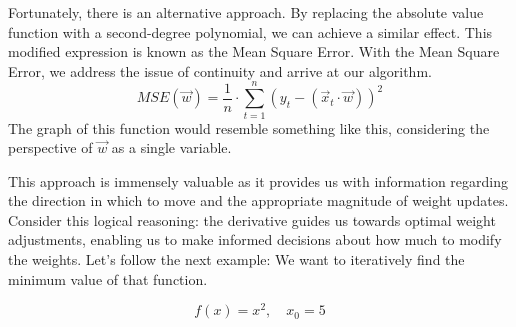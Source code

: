 Fortunately, there is an alternative approach. By replacing the absolute value function with a second-degree
polynomial, we can achieve a similar effect. This modified expression is known as the Mean Square Error. With
the Mean Square Error, we address the issue of continuity and arrive at our algorithm.
\[
MSE(\vec{w}) = \frac{1}{n} \cdot \sum_{t = 1}^{n}(y_t - (\vec{x}_t \cdot \vec{w}))^2
\]
The graph of this function would resemble something like this, considering the perspective of $\vec{w}$
as a single variable.
\begin{center}
\end{center}

This approach is immensely valuable as it provides us with information regarding the direction in which to
move and the appropriate magnitude of weight updates. Consider this logical reasoning: the derivative guides
us towards optimal weight adjustments, enabling us to make informed decisions about how much to modify the
weights. Let's follow the next example: We want to iteratively find the minimum value of that function.

\[
f(x) = x^2,\quad x_0 = 5
\]

